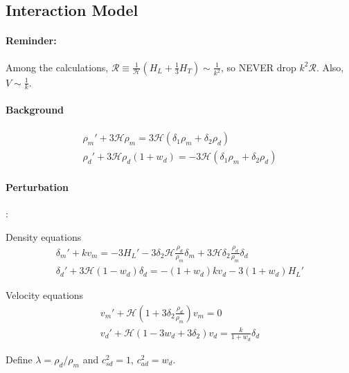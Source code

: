 \documentclass{article}
\begin{document}
\subsection{Interaction Model}

\paragraph{Reminder:} Among the calculations, $\mathcal R \equiv \frac{1}{\mathcal H}(H_L+\frac{1}{3}H_T)\sim \frac{1}{k^2}$, so NEVER drop $k^2 \mathcal R$. Also, $V\sim \frac{1}{k}$.


\paragraph{Background}

\begin{eqnarray}
\rho_m'+3\mathcal H \rho_m =3\mathcal H (\delta_1\rho_m+\delta_2\rho_d)  \\
\rho_d'+3\mathcal H \rho_d(1+w_d)=-3\mathcal H(\delta_1\rho_m+\delta_2\rho_d)
\end{eqnarray}


\paragraph{Perturbation}:



Density equations 
\begin{eqnarray}
\delta_m'+kv_m=-3H_L'-3\delta_2\mathcal H \frac{\rho_d}{\rho_m}\delta_m+3\mathcal H\delta_2 \frac{\rho_d}{\rho_m}\delta_d    \\
\delta_d'+3\mathcal H (1-w_d)\delta_d =-(1+w_d)kv_d-3(1+w_d)H_L'
\end{eqnarray}

Velocity equations
\begin{eqnarray}
v_m'+\mathcal H (1+3\delta_2 \frac{\rho_d}{\rho_m})v_m=0 \\
v_d'+\mathcal H (1-3w_d+3\delta_2)v_d=\frac{k}{1+w_d}\delta_d
\end{eqnarray}


Define $\lambda=\rho_d/\rho_m$ and $c_{sd}^2=1$, $c_{ad}^2=w_d$.

\end{document}
